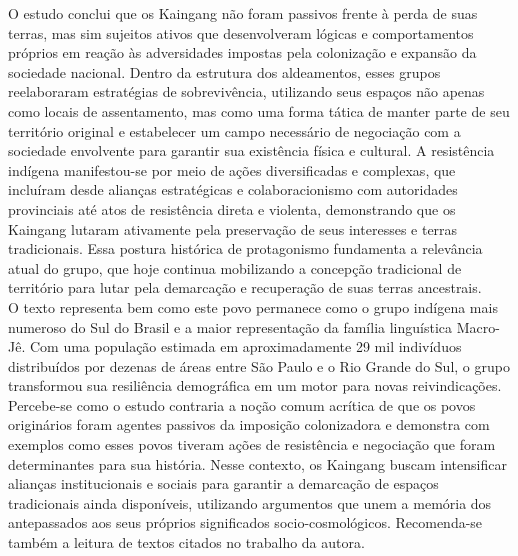\documentclass[12pt, a4paper]{article}
\begin{document}
O estudo conclui que os Kaingang não foram passivos frente à perda de suas terras, mas sim sujeitos ativos que desenvolveram lógicas e comportamentos próprios em reação às adversidades impostas pela colonização e expansão da sociedade nacional. Dentro da estrutura dos aldeamentos, esses grupos reelaboraram estratégias de sobrevivência, utilizando seus espaços não apenas como locais de assentamento, mas como uma forma tática de manter parte de seu território original e estabelecer um campo necessário de negociação com a sociedade envolvente para garantir sua existência física e cultural. A resistência indígena manifestou-se por meio de ações diversificadas e complexas, que incluíram desde alianças estratégicas e colaboracionismo com autoridades provinciais até atos de resistência direta e violenta, demonstrando que os Kaingang lutaram ativamente pela preservação de seus interesses e terras tradicionais. Essa postura histórica de protagonismo fundamenta a relevância atual do grupo, que hoje continua mobilizando a concepção tradicional de território para lutar pela demarcação e recuperação de suas terras ancestrais.
\\

O texto representa bem como este povo permanece como o grupo indígena mais numeroso do Sul do Brasil e a maior representação da família linguística Macro-Jê. Com uma população estimada em aproximadamente 29 mil indivíduos distribuídos por dezenas de áreas entre São Paulo e o Rio Grande do Sul, o grupo transformou sua resiliência demográfica em um motor para novas reivindicações. Percebe-se como o estudo contraria a noção comum acrítica de que os povos originários foram agentes passivos da imposição colonizadora e demonstra com exemplos como esses povos tiveram ações de resistência e negociação que foram determinantes para sua história. Nesse contexto, os Kaingang buscam intensificar alianças institucionais e sociais para garantir a demarcação de espaços tradicionais ainda disponíveis, utilizando argumentos que unem a memória dos antepassados aos seus próprios significados socio-cosmológicos. Recomenda-se também a leitura de textos citados no trabalho da autora.

%
%
%
%
%
\end{document}
